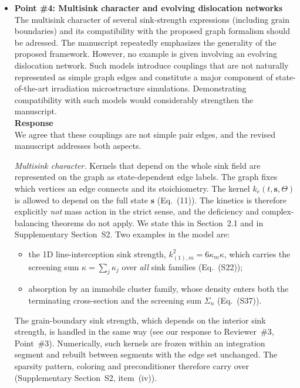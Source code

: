 \documentclass{article}
\newif\ifshowauthornotes
\newcommand{\authornote}[1]{\ifshowauthornotes{\color{red}\ [\textbf{Author action:} #1]}\fi}
\begin{document}
\begin{itemize}
We agree that detailed balance cannot be applied to a sink-strength kernel that is not a pair rate constant, because such a kernel depends on the whole sink field and is of higher order in concentration. We have added a statement to this effect, together with the assumptions above, in Supplementary Section~S3 (Class~IV).

\authornote{Add the statement described in the last paragraph to the Class~IV introduction in S3; it is implied but not stated in the September 17 PDF.}

\item \textbf{Point \#4: Multisink character and evolving dislocation networks}\\
The multisink character of several sink-strength expressions (including grain boundaries) and its compatibility with the proposed graph formalism should be adressed. The manuscript repeatedly emphasizes the generality of the proposed framework. However, no example is given involving an evolving dislocation network. Such models introduce couplings that are not naturally represented as simple graph edges and constitute a major component of state-of-the-art irradiation microstructure simulations. Demonstrating compatibility with such models would considerably strengthen the manuscript.\\

\textbf{Response}\\
We agree that these couplings are not simple pair edges, and the revised manuscript addresses both aspects.

\emph{Multisink character.} Kernels that depend on the whole sink field are represented on the graph as state-dependent edge labels. The graph fixes which vertices an edge connects and its stoichiometry. The kernel $k_e(t,\mathbf{s},\Theta)$ is allowed to depend on the full state $\mathbf{s}$ (Eq.~(11)). The kinetics is therefore explicitly \emph{not} mass action in the strict sense, and the deficiency and complex-balancing theorems do not apply. We state this in Section~2.1 and in Supplementary Section~S2. Two examples in the model are:
\begin{itemize}
    \item the 1D line-interception sink strength, $k^2_{(1),m}=6\kappa_m\kappa$, which carries the screening sum $\kappa=\sum_j\kappa_j$ over \emph{all} sink families (Eq.~(S22));
    \item absorption by an immobile cluster family, whose density enters both the terminating cross-section and the screening sum $\Sigma_n$ (Eq.~(S37)).
\end{itemize}
The grain-boundary sink strength, which depends on the interior sink strength, is handled in the same way (see our response to Reviewer~\#3, Point~\#3). Numerically, such kernels are frozen within an integration segment and rebuilt between segments with the edge set unchanged. The sparsity pattern, coloring and preconditioner therefore carry over (Supplementary Section~S2, item~(iv)).


\end{itemize}
\end{document}
